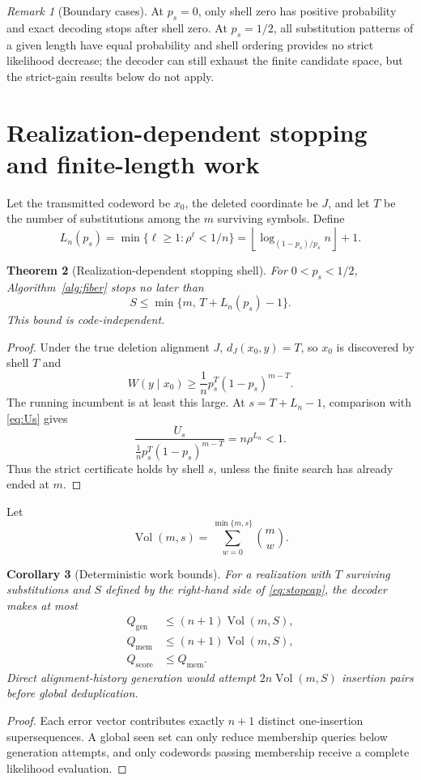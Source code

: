 \documentclass[11pt]{article}
\newtheorem{theorem}{Theorem}
\newtheorem{corollary}[theorem]{Corollary}
\theoremstyle{remark}
\newtheorem{remark}[theorem]{Remark}
\newcommand{\Vol}{\operatorname{Vol}}
\begin{document}
\begin{remark}[Boundary cases]
At $p_s=0$, only shell zero has positive probability and exact decoding stops after shell zero.  At
$p_s=1/2$, all substitution patterns of a given length have equal probability and shell ordering
provides no strict likelihood decrease; the decoder can still exhaust the finite candidate space,
but the strict-gain results below do not apply.
\end{remark}

\section{Realization-dependent stopping and finite-length work}
Let the transmitted codeword be $x_0$, the deleted coordinate be $J$, and let $T$ be the number of
substitutions among the $m$ surviving symbols. Define
\begin{equation}
 L_n(p_s)=\min\{\ell\ge1:\rho^\ell<1/n\}
 =\left\lfloor\log_{(1-p_s)/p_s}n\right\rfloor+1.
 \label{eq:Ln}
\end{equation}

\begin{theorem}[Realization-dependent stopping shell]
For $0<p_s<1/2$, Algorithm~\ref{alg:fiber} stops no later than
\begin{equation}
 S\le \min\{m,\,T+L_n(p_s)-1\}.
 \label{eq:stopcap}
\end{equation}
This bound is code-independent.
\end{theorem}
\begin{proof}
Under the true deletion alignment $J$, $d_J(x_0,y)=T$, so $x_0$ is discovered by shell $T$ and
\[
 W(y\mid x_0)\ge\frac1n p_s^T(1-p_s)^{m-T}.
\]
The running incumbent is at least this large.  At $s=T+L_n-1$, comparison with \eqref{eq:Us}
gives
\[
 \frac{U_s}{\frac1n p_s^T(1-p_s)^{m-T}}
 =n\rho^{L_n}<1.
\]
Thus the strict certificate holds by shell $s$, unless the finite search has already ended at
$m$.
\end{proof}

Let
\[
 \Vol(m,s)=\sum_{w=0}^{\min\{m,s\}}\binom{m}{w}.
\]

\begin{corollary}[Deterministic work bounds]
For a realization with $T$ surviving substitutions and $S$ defined by the right-hand side of
\eqref{eq:stopcap}, the decoder makes at most
\begin{align}
 Q_{\mathrm{gen}}&\le(n+1)\Vol(m,S),\label{eq:qgen}\\
 Q_{\mathrm{mem}}&\le(n+1)\Vol(m,S),\label{eq:qmem}\\
 Q_{\mathrm{score}}&\le Q_{\mathrm{mem}}.\label{eq:qscore}
\end{align}
Direct alignment-history generation would attempt $2n\Vol(m,S)$ insertion pairs before global
deduplication.
\end{corollary}
\begin{proof}
Each error vector contributes exactly $n+1$ distinct one-insertion supersequences.  A global seen
set can only reduce membership queries below generation attempts, and only codewords passing
membership receive a complete likelihood evaluation.
\end{proof}
\end{document}
